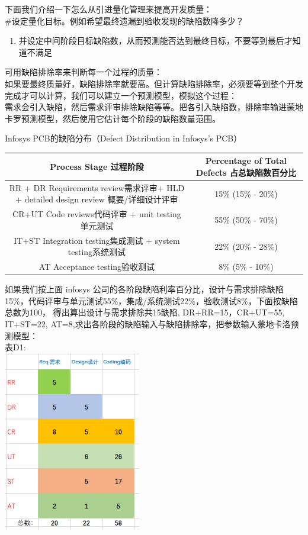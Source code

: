 下面我们介绍一下怎么从引进量化管理来提高开发质量：\\
\#设定量化目标。例如希望最终遗漏到验收发现的缺陷数降多少？

\begin{enumerate}
\tightlist
\item
  并设定中间阶段目标缺陷数，从而预测能否达到最终目标，不要等到最后才知道不满足
\end{enumerate}

可用缺陷排除率来判断每一个过程的质量：\\
如果要最终质量好，缺陷排除率就要高。但计算缺陷排除率，必须要等到整个开发完成才可以计算，我们可以建立一个预测模型，模拟这个过程：\\
需求会引入缺陷，然后需求评审排除缺陷等等。把各引入缺陷数，排除率输进蒙地卡罗预测模型，然后使用它估计每个阶段的缺陷数量范围。

Infosys PCB的缺陷分布（Defect Distribution in Infosys's PCB）



\begin{tabular}{|c|c|}
\hline
Process Stage 过程阶段&Percentage of Total Defects 占总缺陷数百分比\\
\hline
RR + DR Requirements review需求评审+ HLD + detailed design review 概要/详细设计评审&15\% (15\% - 20\%) \\
\hline
CR+UT Code reviews代码评审 + unit testing单元测试&55\% (50\% - 70\%) \\
\hline
IT+ST Integration testing集成测试 + system testing系统测试&22\% (20\% - 28\%)  \\
\hline
AT Acceptance testing验收测试&8\% (5\% - 10\%) \\
\hline
\end{tabular}

如果我们按上面 infosys
公司的各阶段缺陷利率百分比，设计与需求排除缺陷15\%，代码评审与单元测试55\%，集成/系统测试22\%，验收测试8\%，下面按缺陷总数为100，
得出算出设计与需求排除共15缺陷, DR+RR=15，CR+UT=55, IT+ST=22,
AT=8,求出各阶段的缺陷输入与缺陷排除率，把参数输入蒙地卡洛预测模型：\\
表D1:\\
\includegraphics[width=6cm]{1113correctEgScreenshot_2021-11-13_212414.png}

